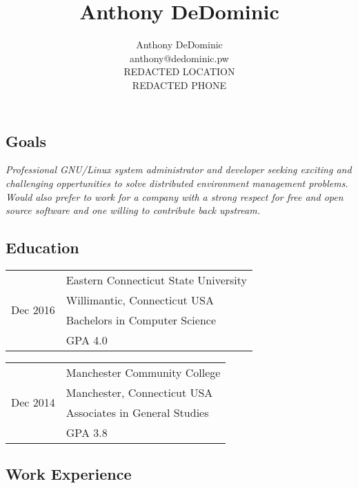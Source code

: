 \documentclass[10pt,letterpaper,]{article}
\author{Anthony DeDominic\\anthony@dedominic.pw\\REDACTED LOCATION\\REDACTED PHONE}
\title{Anthony DeDominic}
\date{}
\begin{document}

\subsection{Goals}\label{goals}

\emph{Professional GNU/Linux system administrator and developer seeking
exciting and challenging oppertunities to solve distributed environment
management problems. Would also prefer to work for a company with
a strong respect for free and open source software and one willing to
contribute back upstream.}

\subsection{Education}\label{education}

\begin{table}[!h]
    \begin{minipage}{0.5\linewidth}
    \centering
    \begin{tabular}{l|l}
        \multirow{4}{*}{Dec 2016}
        & Eastern Connecticut State University \\
        & Willimantic, Connecticut USA \\
        & Bachelors in Computer Science \\
        & GPA 4.0 \\
    \end{tabular}
    \end{minipage}
    \begin{minipage}{0.5\linewidth}
    \centering
    \begin{tabular}{l|l}
        \multirow{4}{*}{Dec 2014} 
        & Manchester Community College \\
        & Manchester, Connecticut USA \\
        & Associates in General Studies \\
        & GPA 3.8 \\
    \end{tabular}
    \end{minipage}
\end{table}

\subsection{Work Experience}\label{work-experience}
\end{document}
